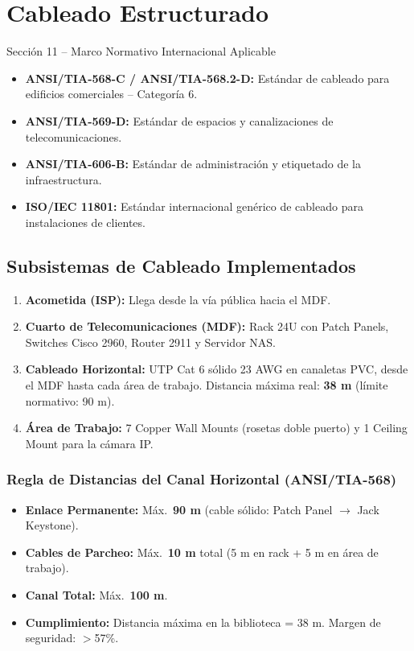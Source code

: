 \documentclass[12pt,a4paper]{article}
\begin{document}
\section{Cableado Estructurado}

\begin{cajanorma}{Sección 11 -- Marco Normativo Internacional Aplicable}
  \begin{itemize}[leftmargin=1em,itemsep=2pt]
    \item \textbf{ANSI/TIA-568-C / ANSI/TIA-568.2-D:} Estándar de cableado para edificios comerciales -- Categoría 6.
    \item \textbf{ANSI/TIA-569-D:} Estándar de espacios y canalizaciones de telecomunicaciones.
    \item \textbf{ANSI/TIA-606-B:} Estándar de administración y etiquetado de la infraestructura.
    \item \textbf{ISO/IEC 11801:} Estándar internacional genérico de cableado para instalaciones de clientes.
  \end{itemize}
\end{cajanorma}

\subsection{Subsistemas de Cableado Implementados}
\begin{enumerate}[leftmargin=1.8em,label=\textbf{\arabic*.},itemsep=3pt]
  \item \textbf{Acometida (ISP):} Llega desde la vía pública hacia el MDF.
  \item \textbf{Cuarto de Telecomunicaciones (MDF):} Rack 24U con Patch Panels, Switches Cisco 2960, Router 2911 y Servidor NAS.
  \item \textbf{Cableado Horizontal:} UTP Cat 6 sólido 23 AWG en canaletas PVC, desde el MDF hasta cada área de trabajo. Distancia máxima real: \textbf{38 m} (límite normativo: 90 m).
  \item \textbf{Área de Trabajo:} 7 Copper Wall Mounts (rosetas doble puerto) y 1 Ceiling Mount para la cámara IP.
\end{enumerate}

\subsubsection{Regla de Distancias del Canal Horizontal (ANSI/TIA-568)}
\begin{itemize}[leftmargin=1.5em,itemsep=2pt]
  \item \textbf{Enlace Permanente:} Máx.\ \textbf{90 m} (cable sólido: Patch Panel $\to$ Jack Keystone).
  \item \textbf{Cables de Parcheo:} Máx.\ \textbf{10 m} total (5 m en rack + 5 m en área de trabajo).
  \item \textbf{Canal Total:} Máx.\ \textbf{100 m}.
  \item \textbf{Cumplimiento:} Distancia máxima en la biblioteca = 38 m. Margen de seguridad: $>$57\%.
\end{itemize}
\end{document}
